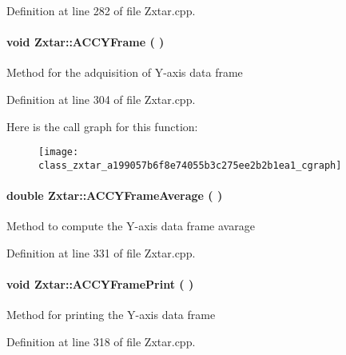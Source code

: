 \begin{appendices}
\-Definition at line 282 of file \-Zxtar.\-cpp.

\paragraph[{\-A\-C\-C\-Y\-Frame}]{\setlength{\rightskip}{0pt plus 5cm}void {\bf \-Zxtar\-::\-A\-C\-C\-Y\-Frame} (
)}\label{class_zxtar_a199057b6f8e74055b3c275ee2b2b1ea1}
\-Method for the adquisition of \-Y-\/axis data frame 

\-Definition at line 304 of file \-Zxtar.\-cpp.



\-Here is the call graph for this function\-:\nopagebreak
\begin{figure}[H]
\begin{center}
\leavevmode
\texttt{[image: class\_zxtar\_a199057b6f8e74055b3c275ee2b2b1ea1\_cgraph]}
\end{center}
\end{figure}


\paragraph[{\-A\-C\-C\-Y\-Frame\-Average}]{\setlength{\rightskip}{0pt plus 5cm}double {\bf \-Zxtar\-::\-A\-C\-C\-Y\-Frame\-Average} (
)}\label{class_zxtar_a2ae4a211920a7ed0709956aa2d378508}
\-Method to compute the \-Y-\/axis data frame avarage 

\-Definition at line 331 of file \-Zxtar.\-cpp.

\paragraph[{\-A\-C\-C\-Y\-Frame\-Print}]{\setlength{\rightskip}{0pt plus 5cm}void {\bf \-Zxtar\-::\-A\-C\-C\-Y\-Frame\-Print} (
)}\label{class_zxtar_aa65c533b4afabe807a8c603a3538c3a3}
\-Method for printing the \-Y-\/axis data frame 

\-Definition at line 318 of file \-Zxtar.\-cpp.


\end{appendices}
